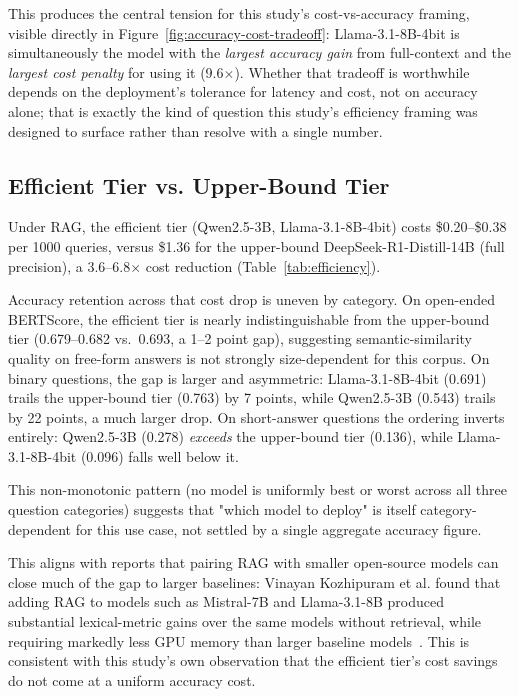 \documentclass[conference]{IEEEtran}
\begin{document}
This produces the central tension for this study's cost-vs-accuracy framing, visible directly in Figure~\ref{fig:accuracy-cost-tradeoff}: Llama-3.1-8B-4bit is simultaneously the model with the \textit{largest accuracy gain} from full-context and the \textit{largest cost penalty} for using it (9.6$\times$).
Whether that tradeoff is worthwhile depends on the deployment's tolerance for latency and cost, not on accuracy alone; that is exactly the kind of question this study's efficiency framing was designed to surface rather than resolve with a single number.

\subsection{Efficient Tier vs. Upper-Bound Tier}

Under RAG, the efficient tier (Qwen2.5-3B, Llama-3.1-8B-4bit) costs \$0.20--\$0.38 per 1000 queries, versus \$1.36 for the upper-bound DeepSeek-R1-Distill-14B (full precision), a 3.6--6.8$\times$ cost reduction (Table~\ref{tab:efficiency}).

Accuracy retention across that cost drop is uneven by category.
On open-ended BERTScore, the efficient tier is nearly indistinguishable from the upper-bound tier (0.679--0.682 vs.\ 0.693, a 1--2 point gap), suggesting semantic-similarity quality on free-form answers is not strongly size-dependent for this corpus.
On binary questions, the gap is larger and asymmetric: Llama-3.1-8B-4bit (0.691) trails the upper-bound tier (0.763) by 7 points, while Qwen2.5-3B (0.543) trails by 22 points, a much larger drop.
On short-answer questions the ordering inverts entirely: Qwen2.5-3B (0.278) \textit{exceeds} the upper-bound tier (0.136), while Llama-3.1-8B-4bit (0.096) falls well below it.

This non-monotonic pattern (no model is uniformly best or worst across all three question categories) suggests that "which model to deploy" is itself category-dependent for this use case, not settled by a single aggregate accuracy figure.

This aligns with reports that pairing RAG with smaller open-source models can close much of the gap to larger baselines: Vinayan Kozhipuram et al. found that adding RAG to models such as Mistral-7B and Llama-3.1-8B produced substantial lexical-metric gains over the same models without retrieval, while requiring markedly less GPU memory than larger baseline models~\cite{vinayankozhipuram2025multimetric}. This is consistent with this study's own observation that the efficient tier's cost savings do not come at a uniform accuracy cost.
\end{document}
